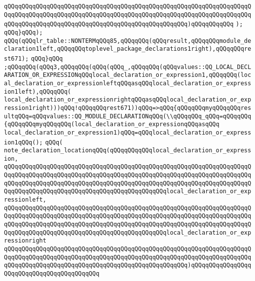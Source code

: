 \verb|qQQqqQQqqQQqqQQqqQQqqQQqqQQqqQQqqQQqqQQqqQQqqQQqqQQqqQQqqQQqqQQqqQQqqQQqqQQqqQQqqQQqqQQqqQQqqQQqqQQqqQQqqQQqqQQqqQQqqQQqqQQqqQQqqQQqqQQqqQQqqQQqqQQqqQQqqQQqqQQqqQQqqQQqqQQqqQQqqQQqqQQqqQQqqQQq)qQQqqQQqqQQq|\newline
\verb|);|\newline
\verb|qQQq}qQQq);|\newline
\verb|qQQq(qQQqlr_table::NONTERMqQQq85,qQQqqQQq(qQQqresult,qQQqqQQqmodule_declaration1left,qQQqqQQqtoplevel_package_declarations1right),qQQqqQQqrest671);|\newline
\verb|qQQq}qQQq|\newline
\verb|;qQQqqQQq(qQQq3,qQQqqQQq(qQQq(qQQq_,qQQqqQQq(qQQqvalues::QQ_LOCAL_DECLARATION_OR_EXPRESSIONqQQqlocal_declaration_or_expression1,qQQqqQQq(local_declaration_or_expressionleftqQQqasqQQqlocal_declaration_or_expression1left),qQQqqQQq(|\newline
\verb|local_declaration_or_expressionrightqQQqasqQQqlocal_declaration_or_expression1right)))qQQq!qQQqqQQqrest671))qQQq=>qQQq{qQQqqQQqmyqQQqqQQqresultqQQq=qQQqvalues::QQ_MODULE_DECLARATIONqQQq(\\qQQqqQQq_qQQq=qQQqqQQq{qQQqqQQqmyqQQqqQQq(local_declaration_or_expressionqQQqasqQQq|\newline
\verb|local_declaration_or_expression1)qQQq=qQQqlocal_declaration_or_expression1qQQq();|\newline
\verb|qQQq(|\newline
\verb|note_declaration_locationqQQq(qQQqqQQqqQQqlocal_declaration_or_expression,|\newline
\verb|qQQqqQQqqQQqqQQqqQQqqQQqqQQqqQQqqQQqqQQqqQQqqQQqqQQqqQQqqQQqqQQqqQQqqQQqqQQqqQQqqQQqqQQqqQQqqQQqqQQqqQQqqQQqqQQqqQQqqQQqqQQqqQQqqQQqqQQqqQQqqQQqqQQqqQQqqQQqqQQqqQQqqQQqqQQqqQQqqQQqqQQqqQQqqQQqqQQqqQQqqQQqqQQqqQQqqQQqqQQqqQQqqQQqqQQqqQQqqQQqqQQqqQQqqQQqqQQqlocal_declaration_or_expressionleft,|\newline
\verb|qQQqqQQqqQQqqQQqqQQqqQQqqQQqqQQqqQQqqQQqqQQqqQQqqQQqqQQqqQQqqQQqqQQqqQQqqQQqqQQqqQQqqQQqqQQqqQQqqQQqqQQqqQQqqQQqqQQqqQQqqQQqqQQqqQQqqQQqqQQqqQQqqQQqqQQqqQQqqQQqqQQqqQQqqQQqqQQqqQQqqQQqqQQqqQQqqQQqqQQqqQQqqQQqqQQqqQQqqQQqqQQqqQQqqQQqqQQqqQQqqQQqqQQqqQQqqQQqlocal_declaration_or_expressionright|\newline
\verb|qQQqqQQqqQQqqQQqqQQqqQQqqQQqqQQqqQQqqQQqqQQqqQQqqQQqqQQqqQQqqQQqqQQqqQQqqQQqqQQqqQQqqQQqqQQqqQQqqQQqqQQqqQQqqQQqqQQqqQQqqQQqqQQqqQQqqQQqqQQqqQQqqQQqqQQqqQQqqQQqqQQqqQQqqQQqqQQqqQQqqQQqqQQqqQQq)qQQqqQQqqQQqqQQqqQQqqQQqqQQqqQQqqQQqqQQqqQQq|\newline
